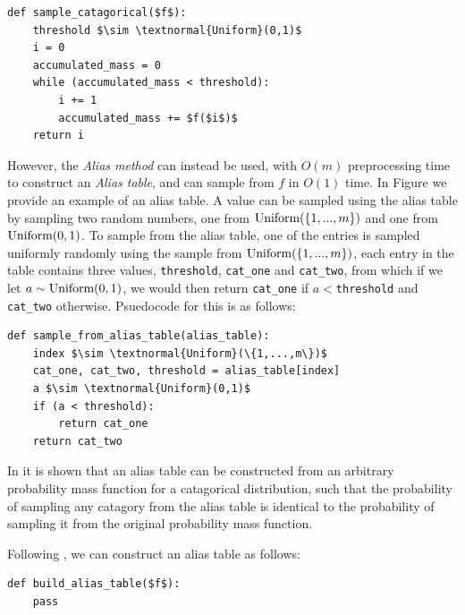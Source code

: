     \begin{lstlisting}
def sample_catagorical($f$):
    threshold $\sim \textnormal{Uniform}(0,1)$
    i = 0
    accumulated_mass = 0
    while (accumulated_mass < threshold):
        i += 1
        accumulated_mass += $f($i$)$
    return i
    \end{lstlisting}

    However, the \textit{Alias method}  can instead be used, with $O(m)$ preprocessing time to construct an \textit{Alias table}, and can sample from $f$ in $O(1)$ time. In Figure  we provide an example of an alias table. A value can be sampled using the alias table by sampling two random numbers, one from $\textnormal{Uniform}(\{1,...,m\})$ and one from $\textnormal{Uniform}(0,1)$. To sample from the alias table, one of the entries is sampled uniformly randomly using the sample from $\textnormal{Uniform}(\{1,...,m\})$, each entry in the table contains three values, \texttt{threshold}, \texttt{cat\_one} and \texttt{cat\_two}, from which if we let $a\sim\textnormal{Uniform}(0,1)$, we would then return \texttt{cat\_one} if $a<$\texttt{threshold} and \texttt{cat\_two} otherwise. Psuedocode for this is as follows:

    \begin{lstlisting}
def sample_from_alias_table(alias_table):
    index $\sim \textnormal{Uniform}(\{1,...,m\})$
    cat_one, cat_two, threshold = alias_table[index]
    a $\sim \textnormal{Uniform}(0,1)$
    if (a < threshold):
        return cat_one 
    return cat_two
    \end{lstlisting}

    In  it is shown  that an alias table can be constructed from an arbitrary probability mass function for a catagorical distribution, such that the probability of sampling any catagory from the alias table is identical to the probability of sampling it from the original probability mass function. 
    

    Following , we can construct an alias table as follows:

    \begin{lstlisting}
def build_alias_table($f$):
    pass
    \end{lstlisting}

